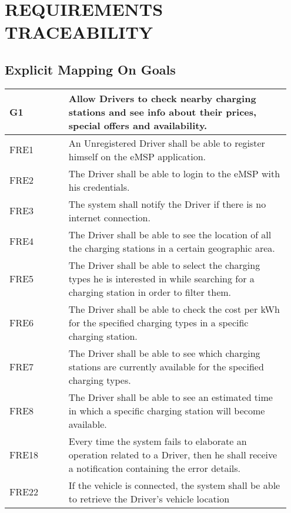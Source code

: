 \chapter{REQUIREMENTS TRACEABILITY}
\label{ch:requirementsTraceability}%
\section{Explicit Mapping On Goals}
{\renewcommand{\arraystretch}{1.5}
\begin{longtable}{|p{0.20\linewidth}p{0.75\linewidth}|}
    \hline
    \rowcolor{bluepoli!40}\textbf{G1} & \textbf{Allow Drivers to check nearby charging stations and see info about their prices, special offers and availability.} \\
    \hline
    \rowcolor{bluepoli!15} FRE1 & An Unregistered Driver shall be able to register himself on the eMSP application. \\
    \hline
    \rowcolor{bluepoli!15} FRE2 & The Driver shall be able to login to the eMSP with his credentials. \\
    \hline 
    \rowcolor{bluepoli!15} FRE3 & The system shall notify the Driver if there is no internet connection. \\
    \hline 
    \rowcolor{bluepoli!15} FRE4 & The Driver shall be able to see the location of all the charging stations in a certain geographic area. \\
    \hline 
    \rowcolor{bluepoli!15} FRE5 & The Driver shall be able to select the charging types he is interested in while searching for a charging station in order to filter them. \\
    \hline 
    \rowcolor{bluepoli!15} FRE6 & The Driver shall be able to check the cost per kWh for the specified charging types in a specific charging station. \\
    \hline  
    \rowcolor{bluepoli!15} FRE7 & The Driver shall be able to see which charging stations are currently available for the specified charging types. \\
    \hline  
    \rowcolor{bluepoli!15} FRE8 & The Driver shall be able to see an estimated time in which a specific charging station will become available. \\
    \hline  
    \rowcolor{bluepoli!15} FRE18 & Every time the system fails to elaborate an operation related to a Driver, then he shall receive a notification containing the error details. \\
    \hline  
    \rowcolor{bluepoli!15} FRE22 & If the vehicle is connected, the system shall be able to retrieve the Driver’s vehicle location \\

\end{longtable}}
